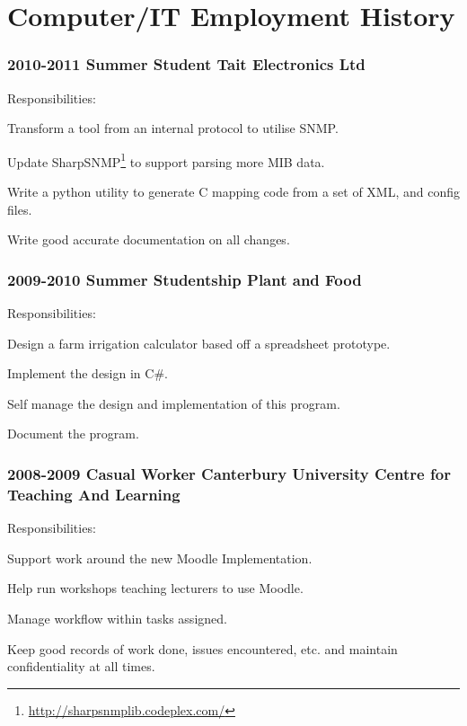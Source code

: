 \documentclass[10pt]{article}
\newenvironment{packed_items}{
    \begin{itemize}
    \setlength{\itemsep}{1pt}
    \setlength{\parskip}{0pt}
    \setlength{\parsep}{0pt}
}{\end{itemize}}
\begin{document}
    \section*{Computer/IT Employment History}
        \subsubsection*{2010-2011 \quad Summer Student \quad Tait Electronics Ltd}\small
            Responsibilities:
            \begin{packed_items}
              \item{Transform a tool from an internal protocol to utilise SNMP.}
              \item{Update SharpSNMP\footnote{\url{http://sharpsnmplib.codeplex.com/}} to support parsing more MIB data.}
              \item{Write a python utility to generate C mapping code from a set of XML, and config files.}
              \item{Write good accurate documentation on all changes.}
            \end{packed_items}
        \subsubsection*{2009-2010 \quad Summer Studentship \quad Plant and Food}\small
            Responsibilities:
            \begin{packed_items}
                \item{Design a farm irrigation calculator based off a spreadsheet prototype.}
                \item{Implement the design in C\#.}
                \item{Self manage the design and implementation of this program.}
                \item{Document the program.}
            \end{packed_items}
        \subsubsection*{2008-2009 \quad Casual Worker \quad Canterbury University Centre for Teaching And Learning}\small
            Responsibilities:
            \begin{packed_items}
                \item{Support work around the new Moodle Implementation.}
                \item{Help run workshops teaching lecturers to use Moodle.}
                \item{Manage workflow within tasks assigned.}
                \item{Keep good records of work done, issues encountered, etc. and maintain confidentiality at all times.}
            \end{packed_items}
\end{document}
